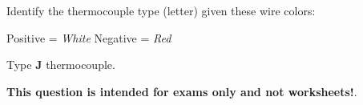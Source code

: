 

Identify the thermocouple type (letter) given these wire colors:

\vskip 10pt

Positive = {\it White} \hskip 50pt Negative = {\it Red}







Type {\bf J} thermocouple.







{\bf This question is intended for exams only and not worksheets!}.


